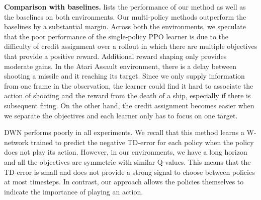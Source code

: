 \textbf{Comparison with baselines.}\quad {} lists the performance of our method as well as the baselines on both environments. 
Our multi-policy methods outperform the baselines by a substantial margin.
Across both the environments, we speculate that the poor performance of the single-policy PPO learner is due to the difficulty of credit assignment over a rollout in which there are multiple objectives that provide a positive reward.
Additional reward shaping only provides moderate gains.
In the Atari Assault environment, there is a delay between shooting a missile and it reaching its target.
Since we only supply information from one frame in the observation, the learner could find it hard to associate the action of shooting and the reward from the death of a ship, especially if there is subsequent firing.
On the other hand, the credit assignment becomes easier when we separate the objectives and each learner only has to focus on one target.

DWN performs poorly in all experiments.
We recall that this method learns a W-network trained to predict the negative TD-error for each policy when the policy does not play its action.
However, in our environments, we have a long horizon and all the objectives are symmetric with similar Q-values.
This means that the TD-error is small and does not provide a strong signal to choose between policies at most timesteps.
In contrast, our approach allows the policies themselves to indicate the importance of playing an action.

